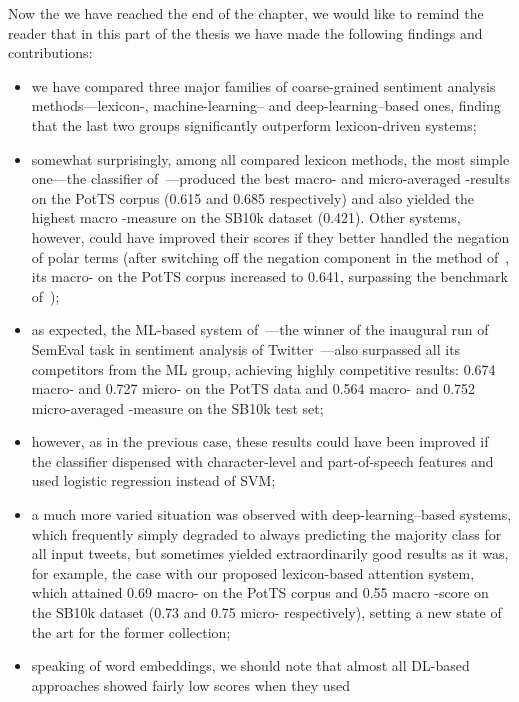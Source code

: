 Now the we have reached the end of the chapter, we would like to
remind the reader that in this part of the thesis we have made the
following findings and contributions:
\begin{itemize}
  \item we have compared three major families of coarse-grained
    sentiment analysis methods---lexicon-, machine-learning-- and
    deep-learning--based ones, finding that the last two groups
    significantly outperform lexicon-driven systems;
  \item somewhat surprisingly, among all compared lexicon methods, the
    most simple one---the classifier of~\citet{Hu:04}---produced the
    best macro- and micro-averaged \F{}-results on the PotTS corpus
    (0.615 and 0.685 respectively) and also yielded the highest macro
    \F{}-measure on the SB10k dataset (0.421).  Other systems,
    however, could have improved their scores if they better handled
    the negation of polar terms (after switching off the negation
    component in the method of~\citeauthor{Musto:14}, its macro-\F{}
    on the PotTS corpus increased to 0.641, surpassing the benchmark
    of~\citeauthor{Hu:04});
  \item as expected, the ML-based system of~\citet{Mohammad:13}---the
    winner of the inaugural run of SemEval task in sentiment analysis
    of Twitter~\cite{Nakov:13}---also surpassed all its competitors
    from the ML group, achieving highly competitive results: 0.674
    macro- and 0.727 micro-\F{} on the PotTS data and 0.564 macro- and
    0.752 micro-averaged \F{}-measure on the SB10k test set;
  \item however, as in the previous case, these results could have
    been improved if the classifier dispensed with character-level and
    part-of-speech features and used logistic regression instead of
    SVM;
  \item a much more varied situation was observed with
    deep-learning--based systems, which frequently simply degraded to
    always predicting the majority class for all input tweets, but
    sometimes yielded extraordinarily good results as it was, for
    example, the case with our proposed lexicon-based attention
    system, which attained 0.69 macro-\F{} on the PotTS corpus and
    0.55 macro \F{}-score on the SB10k dataset (0.73 and 0.75
    micro-\F{} respectively), setting a new state of the art for the
    former collection;
  \item speaking of word embeddings, we should note that almost all
    DL-based approaches showed fairly low scores when they used

\end{itemize}
